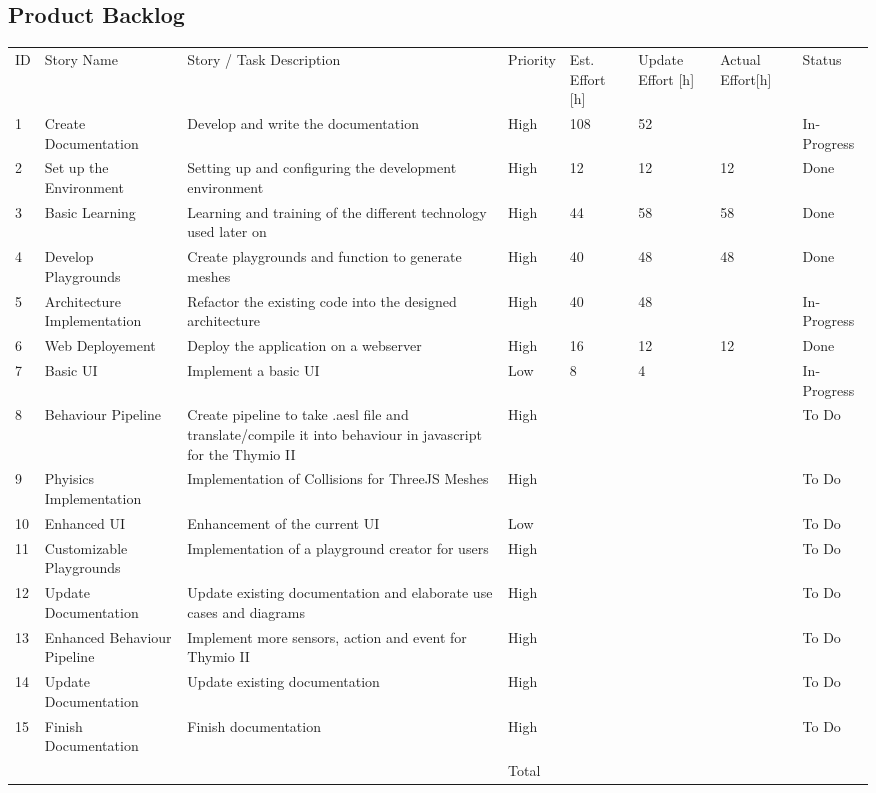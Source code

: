 \documentclass{scrartcl}
\begin{document}
\subsection{Product Backlog}
\begin{longtable}{p{5mm}|p{2cm}|p{4cm}|p{1cm}|p{1cm}|p{1cm}|p{1cm}|p{1cm}}
  ID                     & Story Name & Story / Task Description & Priority & Est. Effort {[}h{]} & Update Effort {[}h{]} & Actual Effort{[}h{]} & Status                \\ 
  1 & Create Documentation & Develop and write the documentation & High & 108 & 52 &  & In-Progress \\ 
  2 & Set up the Environment & Setting up and configuring the development environment & High & 12 & 12 & 12 & Done \\ 
  3 & Basic Learning & Learning and training of the different technology used later on & High & 44 & 58 & 58 & Done \\ 
  4 & Develop Playgrounds & Create playgrounds and function to generate meshes & High & 40 & 48 & 48 & Done \\ 
  5 & Architecture Implementation & Refactor the existing code into the designed architecture & High & 40 & 48 &  & In-Progress}\\ 
  6 & Web Deployement & Deploy the application on a webserver & High & 16 & 12 & 12 & Done \\ 
  7 & Basic UI & Implement a basic UI & Low & 8 & 4 &  & In-Progress \\ 
  8 & Behaviour Pipeline & Create pipeline to take .aesl file and translate/compile it into behaviour in javascript for the Thymio II & High &  &  &  & To Do \\ 
  9 & Phyisics Implementation & Implementation of Collisions for ThreeJS Meshes & High &  &  &  & To Do \\ 
  10 & Enhanced UI & Enhancement of the current UI & Low &  &  &  & To Do \\ 
  11 & Customizable Playgrounds & Implementation of a playground creator for users & High &  &  &  & To Do \\ 
  12 & Update Documentation & Update existing documentation and elaborate use cases and diagrams & High &  &  &  & To Do \\ 
  13 & Enhanced Behaviour Pipeline & Implement more sensors, action and event for Thymio II & High &  &  &  & To Do \\ 
  14 & Update Documentation & Update existing documentation & High &  &  &  & To Do \\ \hline
  15 & Finish Documentation & Finish documentation & High &  &  &  & To Do \\ 
   &  &  & Total &  &  &  &  \\ 
\end{longtable}
\end{document}
